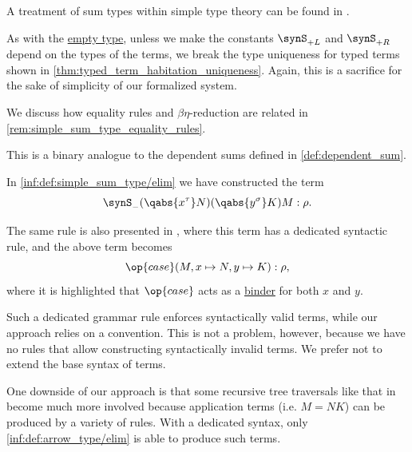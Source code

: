 \begin{comments}
  \item A treatment of sum types within simple type theory can be found in \cite[\S 4.3.3]{Mimram2020ProgramEqualsProof}.

  \item As with the \hyperref[def:simple_empty_type]{empty type}, unless we make the constants \( \synS_{+L} \) and \( \synS_{+R} \) depend on the types of the terms, we break the type uniqueness for typed terms shown in \cref{thm:typed_term_habitation_uniqueness}. Again, this is a sacrifice for the sake of simplicity of our formalized system.

  \item We discuss how equality rules and \( \beta\eta \)-reduction are related in \cref{rem:simple_sum_type_equality_rules}.

  \item This is a binary analogue to the dependent sums defined in \cref{def:dependent_sum}.
\end{comments}

\begin{remark}\label{rem:binders_in_type_theory_terms}
  In \ref{inf:def:simple_sum_type/elim} we have constructed the term
  \begin{equation*}
    \synS_- (\qabs {x^\tau} N) (\qabs {y^\sigma} K) M: \rho.
  \end{equation*}

  The same rule is also presented in \cite[\S 4.3.3]{Mimram2020ProgramEqualsProof}, where this term has a dedicated syntactic rule, and the above term becomes
  \begin{equation*}
    \op{case}(M, x \mapsto N, y \mapsto K): \rho,
  \end{equation*}
  where it is highlighted that \( \op{case} \) acts as a \hyperref[con:variable_binding]{binder} for both \( x \) and \( y \).

  Such a dedicated grammar rule enforces syntactically valid terms, while our approach relies on a convention. This is not a problem, however, because we have no rules that allow constructing syntactically invalid terms. We prefer not to extend the base syntax of terms.
\end{remark}
\begin{comments}
  \item One downside of our approach is that some recursive tree traversals like that in  become much more involved because application terms (i.e. \( M = NK \)) can be produced by a variety of rules. With a dedicated syntax, only \ref{inf:def:arrow_type/elim} is able to produce such terms.
\end{comments}


